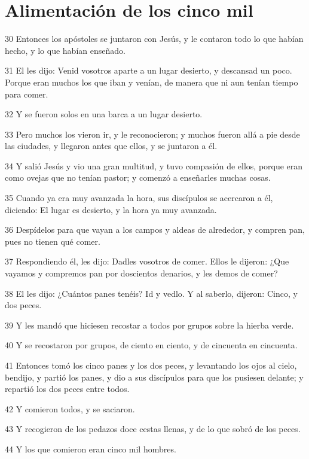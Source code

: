 \section*{Alimentación de los cinco mil}

\par 30 Entonces los apóstoles se juntaron con Jesús, y le contaron todo lo que habían hecho, y lo que habían enseñado.
\par 31 El les dijo: Venid vosotros aparte a un lugar desierto, y descansad un poco. Porque eran muchos los que iban y venían, de manera que ni aun tenían tiempo para comer.
\par 32 Y se fueron solos en una barca a un lugar desierto.
\par 33 Pero muchos los vieron ir, y le reconocieron; y muchos fueron allá a pie desde las ciudades, y llegaron antes que ellos, y se juntaron a él.
\par 34 Y salió Jesús y vio una gran multitud, y tuvo compasión de ellos, porque eran como ovejas que no tenían pastor; y comenzó a enseñarles muchas cosas.
\par 35 Cuando ya era muy avanzada la hora, sus discípulos se acercaron a él, diciendo: El lugar es desierto, y la hora ya muy avanzada.
\par 36 Despídelos para que vayan a los campos y aldeas de alrededor, y compren pan, pues no tienen qué comer.
\par 37 Respondiendo él, les dijo: Dadles vosotros de comer. Ellos le dijeron: ¿Que vayamos y compremos pan por doscientos denarios, y les demos de comer?
\par 38 El les dijo: ¿Cuántos panes tenéis? Id y vedlo. Y al saberlo, dijeron: Cinco, y dos peces.
\par 39 Y les mandó que hiciesen recostar a todos por grupos sobre la hierba verde.
\par 40 Y se recostaron por grupos, de ciento en ciento, y de cincuenta en cincuenta.
\par 41 Entonces tomó los cinco panes y los dos peces, y levantando los ojos al cielo, bendijo, y partió los panes, y dio a sus discípulos para que los pusiesen delante; y repartió los dos peces entre todos.
\par 42 Y comieron todos, y se saciaron.
\par 43 Y recogieron de los pedazos doce cestas llenas, y de lo que sobró de los peces.
\par 44 Y los que comieron eran cinco mil hombres.


